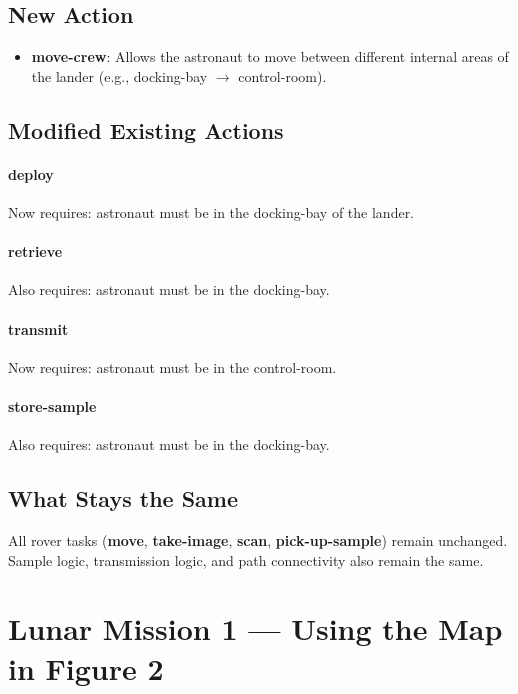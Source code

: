 \documentclass[11pt,a4paper]{article}
\newcommand{\action}[1]{\textbf{\textsf{#1}}}
\begin{document}
\subsection*{New Action}
\begin{itemize}
  \item \action{move-crew}: Allows the astronaut to move between different internal areas of the lander (e.g., docking-bay $\rightarrow$ control-room).
\end{itemize}

\subsection*{Modified Existing Actions}

\paragraph{deploy} Now requires: astronaut must be in the docking-bay of the lander.

\paragraph{retrieve} Also requires: astronaut must be in the docking-bay.

\paragraph{transmit} Now requires: astronaut must be in the control-room.

\paragraph{store-sample} Also requires: astronaut must be in the docking-bay.

\subsection*{What Stays the Same}
All rover tasks (\action{move}, \action{take-image}, \action{scan}, \action{pick-up-sample}) remain unchanged. Sample logic, transmission logic, and path connectivity also remain the same.

\section{Lunar Mission 1 — Using the Map in Figure 2}
\end{document}
